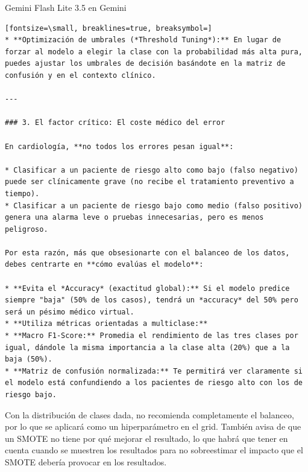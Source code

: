 \documentclass[12pt,a4paper,oneside]{book}
\begin{document}
\begin{iaresp}{Gemini Flash Lite 3.5 en Gemini}
\begin{Verbatim}[fontsize=\small, breaklines=true, breaksymbol=]
* **Optimización de umbrales (*Threshold Tuning*):** En lugar de forzar al modelo a elegir la clase con la probabilidad más alta pura, puedes ajustar los umbrales de decisión basándote en la matriz de confusión y en el contexto clínico.

---

### 3. El factor crítico: El coste médico del error

En cardiología, **no todos los errores pesan igual**:

* Clasificar a un paciente de riesgo alto como bajo (falso negativo) puede ser clínicamente grave (no recibe el tratamiento preventivo a tiempo).
* Clasificar a un paciente de riesgo bajo como medio (falso positivo) genera una alarma leve o pruebas innecesarias, pero es menos peligroso.

Por esta razón, más que obsesionarte con el balanceo de los datos, debes centrarte en **cómo evalúas el modelo**:

* **Evita el *Accuracy* (exactitud global):** Si el modelo predice siempre "baja" (50% de los casos), tendrá un *accuracy* del 50% pero será un pésimo médico virtual.
* **Utiliza métricas orientadas a multiclase:**
* **Macro F1-Score:** Promedia el rendimiento de las tres clases por igual, dándole la misma importancia a la clase alta (20%) que a la baja (50%).
* **Matriz de confusión normalizada:** Te permitirá ver claramente si el modelo está confundiendo a los pacientes de riesgo alto con los de riesgo bajo.
\end{Verbatim}
\end{iaresp}
\begin{iaanalisis}
Con la distribución de clases dada, no recomienda completamente el balanceo, por lo que se aplicará como un hiperparámetro en el grid. También avisa de que un SMOTE no tiene por qué mejorar el resultado, lo que habrá que tener en cuenta cuando se muestren los resultados para no sobreestimar el impacto que el SMOTE debería provocar en los resultados.
\end{iaanalisis}
\end{document}
